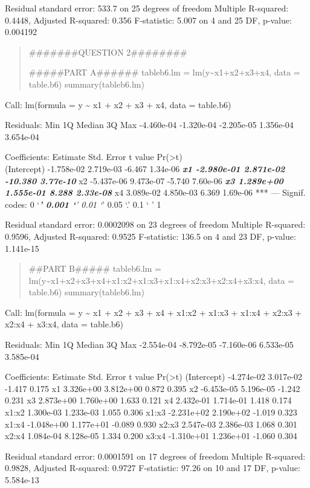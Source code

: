 \documentclass[
]{article}
\begin{document}
Residual standard error: 533.7 on 25 degrees of freedom Multiple
R-squared: 0.4448, Adjusted R-squared: 0.356 F-statistic: 5.007 on 4 and
25 DF, p-value: 0.004192

\begin{quote}
\#\#\#\#\#\#\#QUESTION 2\#\#\#\#\#\#\#\#

\#\#\#\#\#PART A\#\#\#\#\#\# tableb6.lm =
lm(y\textasciitilde x1+x2+x3+x4, data = table.b6) summary(tableb6.lm)
\end{quote}

Call: lm(formula = y \textasciitilde{} x1 + x2 + x3 + x4, data =
table.b6)

Residuals: Min 1Q Median 3Q Max -4.460e-04 -1.320e-04 -2.205e-05
1.356e-04 3.654e-04

Coefficients: Estimate Std. Error t value
Pr(\textgreater\textbar t\textbar)\\
(Intercept) -1.758e-02 2.719e-03 -6.467 1.34e-06 \textbf{\emph{ x1
-2.980e-01 2.871e-02 -10.380 3.77e-10 }} x2 -5.437e-06 9.473e-07 -5.740
7.60e-06 \textbf{\emph{ x3 1.289e+00 1.555e-01 8.288 2.33e-08 }} x4
3.089e-02 4.850e-03 6.369 1.69e-06 *** --- Signif. codes: 0
`\emph{\textbf{' 0.001 `}' 0.01 `}' 0.05 `.' 0.1 ` ' 1

Residual standard error: 0.0002098 on 23 degrees of freedom Multiple
R-squared: 0.9596, Adjusted R-squared: 0.9525 F-statistic: 136.5 on 4
and 23 DF, p-value: 1.141e-15

\begin{quote}
\#\#PART B\#\#\#\#\# tableb6.lm =
lm(y\textasciitilde x1+x2+x3+x4+x1:x2+x1:x3+x1:x4+x2:x3+x2:x4+x3:x4,
data = table.b6) summary(tableb6.lm)
\end{quote}

Call: lm(formula = y \textasciitilde{} x1 + x2 + x3 + x4 + x1:x2 + x1:x3
+ x1:x4 + x2:x3 + x2:x4 + x3:x4, data = table.b6)

Residuals: Min 1Q Median 3Q Max -2.554e-04 -8.792e-05 -7.160e-06
6.533e-05 3.585e-04

Coefficients: Estimate Std. Error t value
Pr(\textgreater\textbar t\textbar) (Intercept) -4.274e-02 3.017e-02
-1.417 0.175 x1 3.326e+00 3.812e+00 0.872 0.395 x2 -6.453e-05 5.196e-05
-1.242 0.231 x3 2.873e+00 1.760e+00 1.633 0.121 x4 2.432e-01 1.714e-01
1.418 0.174 x1:x2 1.300e-03 1.233e-03 1.055 0.306 x1:x3 -2.231e+02
2.190e+02 -1.019 0.323 x1:x4 -1.048e+00 1.177e+01 -0.089 0.930 x2:x3
2.547e-03 2.386e-03 1.068 0.301 x2:x4 1.084e-04 8.128e-05 1.334 0.200
x3:x4 -1.310e+01 1.236e+01 -1.060 0.304

Residual standard error: 0.0001591 on 17 degrees of freedom Multiple
R-squared: 0.9828, Adjusted R-squared: 0.9727 F-statistic: 97.26 on 10
and 17 DF, p-value: 5.584e-13
\end{document}
